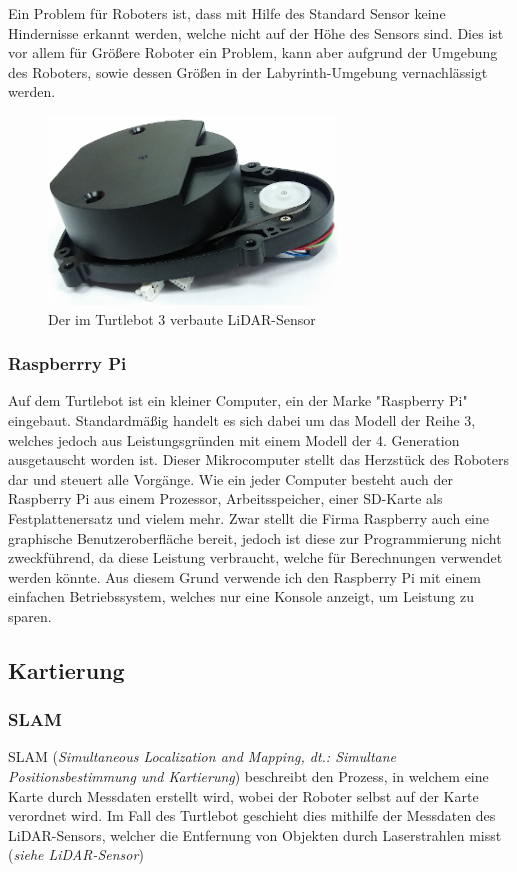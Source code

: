 {{{			Ein Problem für Roboters ist, dass mit Hilfe des Standard Sensor keine Hindernisse erkannt werden, welche nicht auf der Höhe des Sensors sind. Dies ist vor allem für Größere Roboter ein Problem, kann aber aufgrund der Umgebung des Roboters, sowie dessen Größen in der Labyrinth-Umgebung vernachlässigt werden.
			\begin{figure}[H]
				\centering
				\includegraphics[height=5cm]{Bilder/lds_small.png}
				\caption{Der im Turtlebot 3 verbaute LiDAR-Sensor}
				\label{pic:lds_small}
			\end{figure}
		}
		
		\subsubsection{Raspberrry Pi}
		{
			Auf dem Turtlebot ist ein kleiner Computer, ein der Marke "Raspberry Pi" eingebaut. Standardmäßig handelt es sich dabei um das Modell der Reihe 3, welches jedoch aus Leistungsgründen mit einem Modell der 4. Generation ausgetauscht worden ist. Dieser Mikrocomputer stellt das Herzstück des Roboters dar und steuert alle Vorgänge. Wie ein jeder Computer besteht auch der Raspberry Pi aus einem Prozessor, Arbeitsspeicher, einer SD-Karte als Festplattenersatz und vielem mehr. Zwar stellt die Firma Raspberry auch eine graphische Benutzeroberfläche bereit, jedoch ist diese zur Programmierung nicht zweckführend, da diese Leistung verbraucht, welche für Berechnungen verwendet werden könnte. Aus diesem Grund verwende ich den Raspberry Pi mit einem einfachen Betriebssystem, welches nur eine Konsole anzeigt, um Leistung zu sparen.
		}
	}
	\subsection{Kartierung}
	{
		\subsubsection{SLAM}
		{
			SLAM (\textit{Simultaneous Localization and Mapping, dt.: Simultane Positionsbestimmung und Kartierung}) beschreibt den Prozess, in welchem eine Karte durch Messdaten erstellt wird, wobei der Roboter selbst auf der Karte verordnet wird.
			Im Fall des Turtlebot geschieht dies mithilfe der Messdaten des LiDAR-Sensors, welcher die Entfernung von Objekten durch Laserstrahlen misst (\textit{siehe LiDAR-Sensor})	
		}
		
}}
